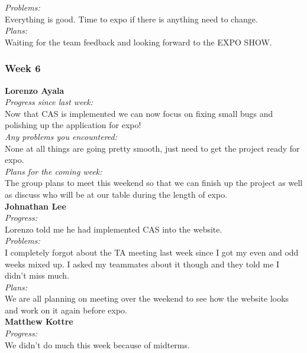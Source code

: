 \noindent\textit{Problems:}\\
\noindent Everything is good. Time to expo if there is anything need to change.\\

\noindent\textit{Plans:}\\
\noindent  Waiting for the team feedback and looking forward to the EXPO SHOW.\\

\subsubsection{Week 6}

\textbf{Lorenzo Ayala}\\
\noindent\textit{Progress since last week:}\\
Now that CAS is implemented we can now focus on fixing small bugs and polishing up the application for expo!\\

\noindent\textit{Any problems you encountered:}\\
\noindent None at all things are going pretty smooth, just need to get the project ready for expo.\\

\noindent\textit{Plans for the coming week:}\\
\noindent The group plans to meet this weekend so that we can finish up the project as well as discuss who will be at our table during the length of expo.\\

\noindent\textbf{Johnathan Lee}\\
\noindent\textit{Progress:}\\
Lorenzo told me he had implemented CAS into the website. \\ 

\noindent\textit{Problems:}\\
\noindent I completely forgot about the TA meeting last week since I got my even and odd weeks mixed up. I asked my teammates about it though and they told me I didn't miss much.\\

\noindent\textit{Plans:}\\
\noindent We are all planning on meeting over the weekend to see how the website looks and work on it again before expo.\\

\noindent\textbf{Matthew Kottre}\\
\noindent\textit{Progress:}\\
We didn't do much this week because of midterms.\\

